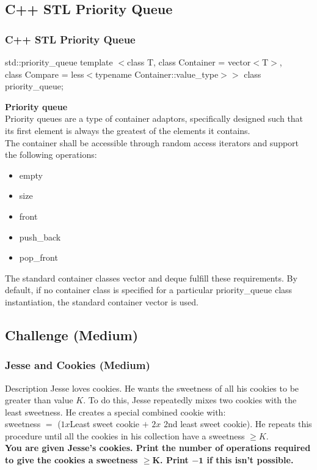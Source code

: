 \documentclass{beamer}
\begin{document}
\subsection{C++ STL Priority Queue} 

\begin{frame}
\frametitle{C++ STL Priority Queue}

\begin{block}{std::priority\_queue}
\small template $<$class T, class Container = vector$<$T$>$,\\
  class Compare = less$<$typename Container::value\_type$>>$ class priority\_queue;
\end{block}

\textbf{Priority queue}\\
Priority queues are a type of container adaptors, specifically designed such that its first element is always the greatest of the elements it contains.
\newline
\\
The container shall be accessible through random access iterators and support the following operations:

\begin{multicols}{3}
\begin{itemize}
	\item empty
	\item size
	\item front
	\item push\_back
	\item pop\_front
\end{itemize}
\end{multicols}

The standard container classes vector and deque fulfill these requirements. By default, if no container class is specified for a particular priority\_queue class instantiation, the standard container vector is used.

\end{frame}
\subsection{Challenge (Medium)}
\begin{frame}
\frametitle{Jesse and Cookies (Medium)}

\begin{block}{Description}
Jesse loves cookies. He wants the sweetness of all his cookies to be greater than value $K$. To do this, Jesse repeatedly mixes two cookies with the least sweetness. He creates a special combined cookie with:\\
\center sweetness  $=$ ($1x$Least sweet cookie $+$  $2x$ 2nd least sweet cookie).\justify
He repeats this procedure until all the cookies in his collection have a sweetness $\ge K$.\\
\textbf{You are given Jesse's cookies. Print the number of operations required to give the cookies a sweetness $\mathbf{\ge K}$. Print $\mathbf{-1}$ if this isn't possible.} 
\end{block}

\end{frame}
\end{document}
